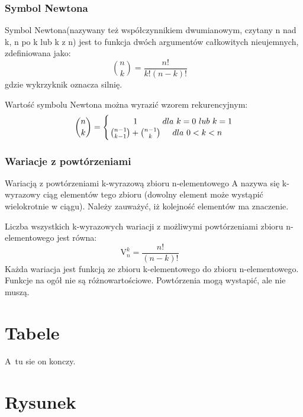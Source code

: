 \documentclass[a4paper,11pt]{article}
\begin{document}
\subsubsection{Symbol Newtona}
Symbol Newtona(nazywany też współczynnikiem dwumianowym, czytany n nad k, n po k lub k z n) jest to funkcja dwóch argumentów całkowitych nieujemnych, zdefiniowana jako:
\begin{displaymath}
{n \choose k}=\frac{ n! }{ k!(n-k)! }\quad
\end{displaymath}
gdzie wykrzyknik oznacza silnię.

Wartość symbolu Newtona można wyrazić wzorem rekurencyjnym:
\begin{displaymath}
{n \choose k}= \Bigg\{{1 \atop {n-1 \choose k-1} + {n-1 \choose k} } {dla \  k=0\  lub\  k=1 \atop dla \  0<k<n }
\end{displaymath}

\subsubsection{Wariacje z powtórzeniami}
Wariacją z powtórzeniami k-wyrazową zbioru n-elementowego A nazywa się k-wyrazowy ciąg elementów tego zbioru (dowolny element może wystąpić wielokrotnie w ciągu). Należy zauważyć, iż kolejność elementów ma znaczenie.

Liczba wszystkich k-wyrazowych wariacji z możliwymi powtórzeniami zbioru n-elementowego jest równa:
\begin{displaymath}
\mathrm{V}_n^k=\frac{ n! }{ (n-k)! }\quad
\end{displaymath}
Każda wariacja jest funkcją ze zbioru k-elementowego do zbioru n-elementowego. Funkcje na ogół nie są różnowartościowe. Powtórzenia mogą wystapić, ale nie muszą.

\section{Tabele}
A~tu sie on konczy.

\section{Rysunek}
\end{document}
